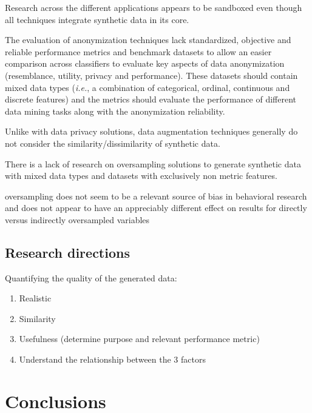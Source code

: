 \documentclass[parskip=full]{scrartcl}
\begin{document}
Research across the different applications appears to be sandboxed even though
all techniques integrate synthetic data in its core.

The evaluation of anonymization techniques lack standardized, objective and
reliable performance metrics and benchmark datasets to allow an easier
comparison across classifiers to evaluate key aspects of data anonymization
(resemblance, utility, privacy and performance). These datasets should contain
mixed data types (\textit{i.e.}, a combination of categorical, ordinal,
continuous and discrete features) and the metrics should evaluate the
performance of different data mining tasks along with the anonymization
reliability.

Unlike with data privacy solutions, data augmentation techniques generally do
not consider the similarity/dissimilarity of synthetic data.

There is a lack of research on oversampling solutions to generate synthetic
data with mixed data types and datasets with exclusively non metric features.





oversampling does not seem to be a relevant source of bias in behavioral
research and does not appear to have an appreciably different effect on
results for directly versus indirectly oversampled
variables~\cite{hauner2014latent}


\subsection{Research directions}


Quantifying the quality of the generated data:

\begin{enumerate}
    \item Realistic
    \item Similarity
    \item Usefulness (determine purpose and relevant performance metric)
    \item Understand the relationship between the 3 factors
\end{enumerate}

\section{Conclusions}



\end{document}
